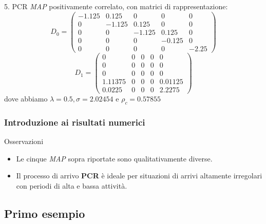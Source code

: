 \documentclass{beamer}
\begin{document}
\begin{frame}
    \frametitle{}
    \begin{block}{5. PCR}
        \emph{MAP} positivamente correlato, con matrici di rappresentazione:
        \small{\begin{equation*}
            D_0 =
            \begin{pmatrix}
                -1.125 & 0.125 & 0 & 0 & 0 \\
                0 & -1.125 & 0.125 & 0 & 0 \\
                0 & 0 & -1.125 & 0.125 & 0 \\
                0 & 0 & 0 & -0.125 & 0 \\
                0 & 0 & 0 & 0 & -2.25
            \end{pmatrix}
        \end{equation*}
        \begin{equation*}
            D_1 =
            \begin{pmatrix}
                0 & 0 & 0 & 0 & 0 \\
                0 & 0 & 0 & 0 & 0 \\
                0 & 0 & 0 & 0 & 0 \\
                1.11375 & 0 & 0 & 0 & 0.01125 \\
                0.0225 & 0 & 0 & 0 & 2.2275
            \end{pmatrix}
        \end{equation*}}
        dove abbiamo $\lambda = 0.5, \sigma = 2.02454$ e $\rho_c =  0.57855$
    \end{block}
\end{frame}


\begin{frame}
    \frametitle{Introduzione ai risultati numerici}
    \begin{block}{Osservazioni}
        \begin{itemize}
            \item Le cinque \emph{MAP} sopra riportate sono qualitativamente diverse.
            \item Il processo di arrivo \textbf{PCR} è ideale per situazioni di arrivi altamente irregolari con periodi di alta e bassa attività.
        \end{itemize}
    \end{block}
\end{frame}

\subsection{Primo esempio}
\end{document}
